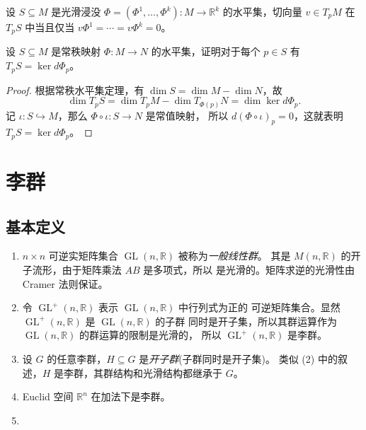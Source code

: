 \documentclass[fontset=none]{Notes}
\DeclareMathOperator\GL{GL}
\begin{document}
\begin{corollary}
  设 $S\subseteq M$ 是光滑浸没 $\varPhi=(\varPhi^1,\dots,\varPhi^k):M\to \mathbb{R}^k$
  的水平集，切向量 $v\in T_pM$ 在 $T_pS$ 中当且仅当 $v\varPhi^1=\cdots=v\varPhi^k=0$。
\end{corollary}

\begin{exercise}\label{exer:tangent space of submanifold}
  设 $S\subseteq M$ 是常秩映射 $\varPhi:M\to N$ 的水平集，证明对于每个 $p\in S$
  有 $T_pS=\ker d\varPhi_p$。
\end{exercise}
\begin{proof}
  根据常秩水平集定理，有 $\dim S=\dim M-\dim N$，故
  \[
    \dim T_pS=\dim T_pM-\dim T_{\varPhi(p)}N=\dim \ker d\varPhi_p.
  \]
  记 $\iota:S\hookrightarrow M$，那么 $\varPhi\circ\iota:S\to N$ 是常值映射，
  所以 $d(\varPhi\circ \iota)_p=0$，这就表明 $T_pS=\ker d\varPhi_p$。
\end{proof}



\chapter{李群}

\section{基本定义}

\begin{example}[李群]
  \mbox{}
  \begin{enumerate}
    \item $n\times n$ 可逆实矩阵集合 $\GL(n,\mathbb{R})$ 被称为\emph{一般线性群}。
    其是 $M(n,\mathbb{R})$ 的开子流形，由于矩阵乘法 $AB$ 是多项式，所以
    是光滑的。矩阵求逆的光滑性由 Cramer 法则保证。
    \item 令 $\GL^+(n,\mathbb{R})$ 表示 $\GL(n,\mathbb{R})$ 中行列式为正的
    可逆矩阵集合。显然 $\GL^+(n,\mathbb{R})$ 是 $\GL(n,\mathbb{R})$ 的子群
    同时是开子集，所以其群运算作为 $\GL(n,\mathbb{R})$ 的群运算的限制是光滑的，
    所以 $\GL^+(n,\mathbb{R})$ 是李群。
    \item 设 $G$ 的任意李群，$H\subseteq G$ 是\emph{开子群}(子群同时是开子集)。
    类似 (2) 中的叙述，$H$ 是李群，其群结构和光滑结构都继承于 $G$。
    \item Euclid 空间 $\mathbb{R}^n$ 在加法下是李群。
    \item 
  \end{enumerate}
\end{example}
\end{document}
